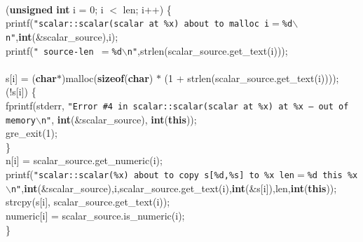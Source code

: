 \begin{flushleft}
\hspace*{4\indentation}\mbox{}\\
\hspace*{4\indentation}{\bf for} ({\bf unsigned} {\bf int} i = 0; i $<$ len; i++) \{\mbox{}\\
\hspace*{8\indentation}printf({\tt"scalar::scalar(scalar at \%x) about to malloc i$=$\%d$\backslash$n"},{\bf int}(\&scalar\_source),i);\mbox{}\\
\hspace*{8\indentation}printf({\tt"                                   source-len $=$\%d$\backslash$n"},strlen(scalar\_source.get\_text(i)));\mbox{}\\
\hspace*{1\indentation}\mbox{}\\
\hspace*{8\indentation}s[i] = ({\bf char}$\ast$)malloc({\bf sizeof}({\bf char}) $\ast$ (1 + strlen(scalar\_source.get\_text(i))));\mbox{}\\
\hspace*{8\indentation}{\bf if} (!s[i]) \{\mbox{}\\
\hspace*{8\indentation}fprintf(stderr, {\tt"Error \#4 in scalar::scalar(scalar at \%x) at \%x -- out of memory$\backslash$n"}, {\bf int}(\&scalar\_source), {\bf int}({\bf this}));\mbox{}\\
\hspace*{12\indentation}gre\_exit(1);\mbox{}\\
\hspace*{8\indentation}\}\mbox{}\\
\hspace*{8\indentation}n[i] = scalar\_source.get\_numeric(i);\mbox{}\\
\hspace*{8\indentation}printf({\tt"scalar::scalar(\%x) about to copy s[\%d,\%s] to \%x   len$=$\%d  this \%x$\backslash$n"},{\bf int}(\&scalar\_source),i,scalar\_source.get\_text(i),{\bf int}(\&s[i]),len,{\bf int}({\bf this}));\mbox{}\\
\hspace*{8\indentation}strcpy(s[i], scalar\_source.get\_text(i));\mbox{}\\
\hspace*{8\indentation}numeric[i] = scalar\_source.is\_numeric(i);\mbox{}\\
\hspace*{4\indentation}\}\mbox{}\\

\end{flushleft}
